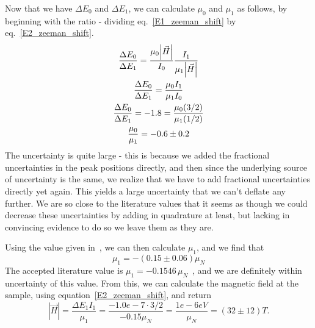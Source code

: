 \documentclass[reprint, nobibnotes, amssymb, amsmath, amsfonts, mathtools, mathrsfs, floatfix]{revtex4-1}
\begin{document}
      Now that we have $\Delta E_0$ and $\Delta E_1$, we can calculate $\mu_0$ and $\mu_1$ as follows, by beginning with the ratio - dividing eq.~\ref{E1_zeeman_shift} by eq.~\ref{E2_zeeman_shift}.
      \begin{gather}
        \frac{\Delta E_0}{\Delta E_1} = \frac{\mu_0 \abs{\vec{H}}}{I_0} \frac{I_1}{\mu_1 \abs{\vec{H}}} \\
        \frac{\Delta E_0}{\Delta E_1} = \frac{\mu_0 I_1}{\mu_1 I_0} \\
        \frac{\Delta E_0}{\Delta E_1} = -1.8 = \frac{\mu_0 (3/2)}{\mu_1 (1/2)} \\
        \frac{\mu_0}{\mu_1} = -0.6 \pm 0.2
      \end{gather}
      The uncertainty is quite large - this is because we added the fractional uncertainties in the peak positions directly, and then since the underlying source of uncertainty is the same, we realize that we have to add fractional uncertainties directly yet again.  This yields a large uncertainty that we can't deflate any further.  We are so close to the literature values that it seems as though we could decrease these uncertainties by adding in quadrature at least, but lacking in convincing evidence to do so we leave them as they are.

      Using the value given in~\cite{lab_manual}, we can then calculate $\mu_1$, and we find that
      \begin{equation}
        \mu_1 = -(0.15\pm0.06)\mu_N
      \end{equation}
      The accepted literature value is $\mu_1 = -0.1546\,\mu_N$~\cite{mu_1}, and we are definitely within uncertainty of this value.  From this, we can calculate the magnetic field at the sample, using equation~\ref{E2_zeeman_shift}, and return
      \begin{equation}
        |\vec{H}| = \frac{\Delta E_1 I_1}{\mu_1} = \frac{-1.0e-7 \cdot 3/2}{-0.15 \mu_N} = \frac{1e-6 eV}{\mu_N} = (32\pm12) T.
      \end{equation}
\end{document}
